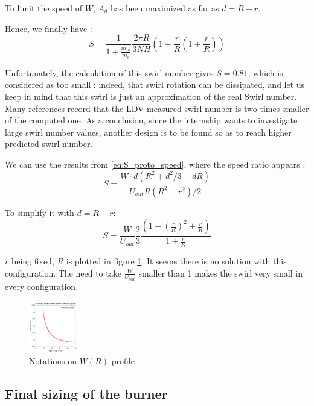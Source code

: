 To limit the speed of $W$, $A_{\theta}$ has been maximized as far as $d=R-r$.

Hence, we finally have :
\begin{equation}
S=\frac{1}{1+\frac{\dot{m_{in}}}{\dot{m_{\theta}}}}\frac{2 \pi R}{3NH}(1+\frac{r}{R}(1+\frac{r}{R}))
\end{equation}


Unfortunately, the calculation of this swirl number gives $S=0.81$, which is considered as too small : indeed, that swirl rotation can be dissipated, and let us keep in mind that this swirl is just an approximation of the real Swirl number. Many references record that the LDV-measured swirl number is two times smaller of the computed one. As a conclusion, since the internship wants to investigate large swirl number values, another design is to be found so as to reach higher predicted swirl number.

We can use the results from \ref{eq:S_proto_speed}, where the speed ratio appears :
\begin{equation}
S=\frac{W \cdot d (R^2+d^2/3-dR)}{U_{out}R(R^2-r^2)/2}
\end{equation}


To simplify it with $d=R-r$:
\begin{equation}
S=\frac{W}{U_{out}}\frac{2}{3}\frac{(1+(\frac{r}{R})^2+\frac{r}{R})}{1+\frac{r}{R}}
\end{equation}


$r$ being fixed, $R$ is plotted in figure \ref{proto_plot}. It seems there is no solution with this configuration. The need to take $\frac{W}{U_{out}}$ smaller than 1 makes the swirl very small in every configuration.


\begin{figure}[h!]
  \centering
\includegraphics[width=0.2\textwidth]{fig/Proto_burner_Swirl.pdf}
  \caption{Notations on $W(R)$ profile}
 \label{proto_plot}
\end{figure}


\newpage
\subsection{Final sizing of the burner}

